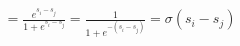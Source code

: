 \documentclass[preview]{standalone}
\begin{document}
\begin{align*}
= \frac{e^{s_i - s_j}}{1 + e^{s_i - s_j}} = \frac{1}{1 + e^{-(s_i - s_j)}} = \sigma(s_i - s_j)
\end{align*}
\end{document}
